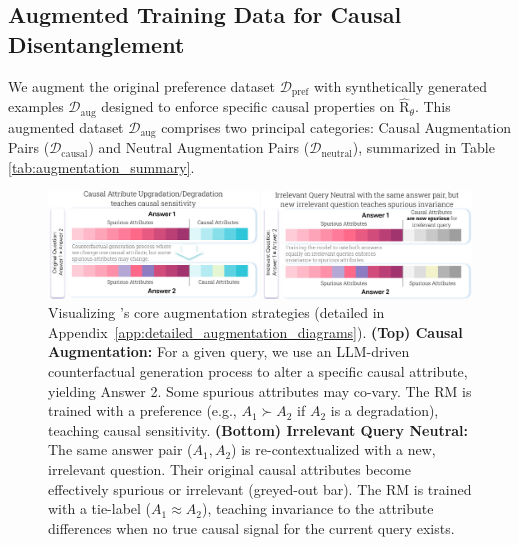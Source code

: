 
\vspace{-0.1in}
\subsection{Augmented Training Data for Causal Disentanglement}
\label{subsec:data_augmentation}


\vspace{-0.1in}
We augment the original preference dataset $\mathcal{D}_{\mathrm{pref}}$ with synthetically generated examples $\mathcal{D}_{\mathrm{aug}}$ designed to enforce specific causal properties on $\hat{\mathrm{R}}_\theta$. This augmented dataset $\mathcal{D}_{\mathrm{aug}}$ comprises two principal categories: Causal Augmentation Pairs ($\mathcal{D}_{\mathrm{causal}}$) and Neutral Augmentation Pairs ($\mathcal{D}_{\mathrm{neutral}}$), summarized in Table \ref{tab:augmentation_summary}.


\begin{figure}[!t]
  \centering
  \includegraphics[width=\linewidth]{images/CausalAugmentationProcess_Horizontal.pdf}
  \vspace{-0.2in}
  \caption{Visualizing \carma's core augmentation strategies (detailed in Appendix~\ref{app:detailed_augmentation_diagrams}).
\textbf{(Top) Causal Augmentation:} For a given query, we use an LLM-driven counterfactual generation process to alter a specific causal attribute, yielding Answer 2. Some spurious attributes may co-vary. The RM is trained with a preference (e.g., $A_1 \succ A_2$ if $A_2$ is a degradation), teaching causal sensitivity.
\textbf{(Bottom) Irrelevant Query Neutral:} The same answer pair ($A_1, A_2$) is re-contextualized with a new, irrelevant question. Their original causal attributes become effectively spurious or irrelevant (greyed-out bar). The RM is trained with a tie-label ($A_1 \approx A_2$), teaching invariance to the  attribute differences when no true causal signal for the current query exists.\vspace{-0.2in}}
\label{fig:carma_augmentation_visual_overview}
  
\end{figure}

